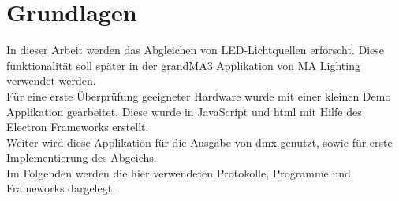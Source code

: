 \documentclass[11pt]{scrartcl}
\begin{document}
\section{Grundlagen}
In dieser Arbeit werden das Abgleichen von LED-Lichtquellen erforscht. Diese funktionalität soll später in der
grandMA3 Applikation von MA Lighting verwendet werden.\\
Für eine erste Überprüfung geeigneter Hardware wurde mit einer kleinen Demo Applikation gearbeitet. Diese wurde
in JavaScript und \ac{html} mit Hilfe des Electron Frameworks erstellt.\\
Weiter wird diese Applikation für die Ausgabe von \ac{dmx} genutzt, sowie für erste Implementierung des Abgeichs.\\
Im Folgenden werden die hier verwendeten Protokolle, Programme und Frameworks dargelegt.
\end{document}
